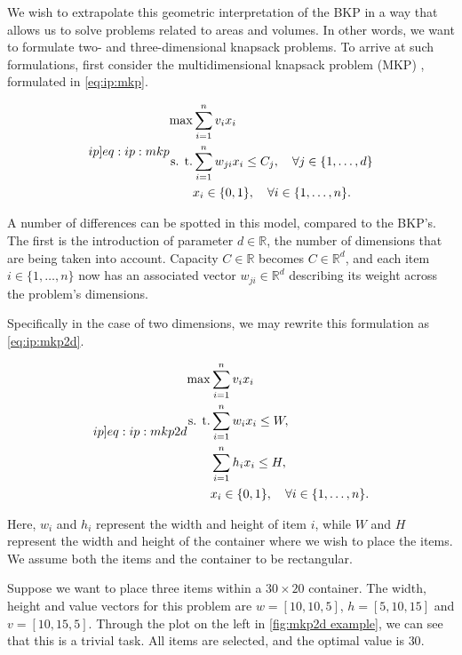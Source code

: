 We wish to extrapolate this geometric interpretation of the BKP in a way that allows us to solve problems related to areas and volumes. In other words, we want to formulate two- and three-dimensional knapsack problems. To arrive at such formulations, first consider the multidimensional knapsack problem (MKP) \cite{LAABADI2018}, formulated in \cref{eq:ip:mkp}.

\begin{align}
    \label[ip]{eq:ip:mkp}
    \begin{split}
        \max & \sum_{i=1}^{n}v_ix_i\\
        \text{s. t.}& \sum_{i=1}^{n}w_{ji}x_i \leq C_j, \quad \forall j \in \{1,\dots,d\}\\
        & x_i \in \{0,1\}, \quad \forall i \in \{1,\dots,n\}.
    \end{split}
\end{align}

A number of differences can be spotted in this model, compared to the BKP's. The first is the introduction of parameter $d \in \mathbb{R}$, the number of dimensions that are being taken into account. Capacity $C \in \mathbb{R}$ becomes $C \in \mathbb{R}^d$, and each item $i \in \{1,\dots,n\}$ now has an associated vector $w_{ji} \in \mathbb{R}^{d}$ describing its weight across the problem's dimensions.

Specifically in the case of two dimensions, we may rewrite this formulation as \cref{eq:ip:mkp2d}.

\begin{align}
    \label[ip]{eq:ip:mkp2d}
    \begin{split}
        \max & \sum_{i=1}^{n}v_ix_i\\
        \text{s. t.}& \sum_{i=1}^{n}w_ix_i \leq W,\\
        & \sum_{i=1}^{n}h_ix_i \leq H,\\
        & x_i \in \{0,1\}, \quad \forall i \in \{1,\dots,n\}.
    \end{split}
\end{align}

Here, $w_i$ and $h_i$ represent the width and height of item $i$, while $W$ and $H$ represent the width and height of the container where we wish to place the items. We assume both the items and the container to be rectangular.

Suppose we want to place three items within a $30 \times 20$ container. The width, height and value vectors for this problem are $w = [10, 10, 5]$, $h = [5, 10, 15]$ and $v = [10, 15, 5]$. Through the plot on the left in \cref{fig:mkp2d example}, we can see that this is a trivial task. All items are selected, and the optimal value is $30$.

